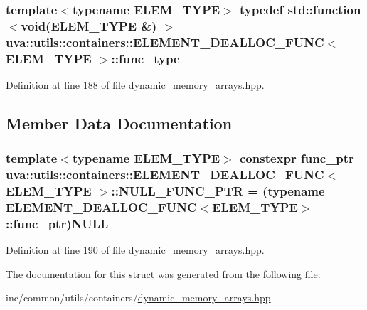 \subsubsection[{func\+\_\+type}]{\setlength{\rightskip}{0pt plus 5cm}template$<$typename E\+L\+E\+M\+\_\+\+T\+Y\+P\+E$>$ typedef std\+::function$<$void(E\+L\+E\+M\+\_\+\+T\+Y\+P\+E \&) $>$ {\bf uva\+::utils\+::containers\+::\+E\+L\+E\+M\+E\+N\+T\+\_\+\+D\+E\+A\+L\+L\+O\+C\+\_\+\+F\+U\+N\+C}$<$ E\+L\+E\+M\+\_\+\+T\+Y\+P\+E $>$\+::{\bf func\+\_\+type}}\label{structuva_1_1utils_1_1containers_1_1_e_l_e_m_e_n_t___d_e_a_l_l_o_c___f_u_n_c_afb6d875c179834ef4e8deca9fff30090}


Definition at line 188 of file dynamic\+\_\+memory\+\_\+arrays.\+hpp.



\subsection{Member Data Documentation}
\hypertarget{structuva_1_1utils_1_1containers_1_1_e_l_e_m_e_n_t___d_e_a_l_l_o_c___f_u_n_c_aa48b076559717c3aedd65ddc46bd3702}{}
\subsubsection[{N\+U\+L\+L\+\_\+\+F\+U\+N\+C\+\_\+\+P\+T\+R}]{\setlength{\rightskip}{0pt plus 5cm}template$<$typename E\+L\+E\+M\+\_\+\+T\+Y\+P\+E$>$ constexpr {\bf func\+\_\+ptr} {\bf uva\+::utils\+::containers\+::\+E\+L\+E\+M\+E\+N\+T\+\_\+\+D\+E\+A\+L\+L\+O\+C\+\_\+\+F\+U\+N\+C}$<$ E\+L\+E\+M\+\_\+\+T\+Y\+P\+E $>$\+::N\+U\+L\+L\+\_\+\+F\+U\+N\+C\+\_\+\+P\+T\+R = (typename {\bf E\+L\+E\+M\+E\+N\+T\+\_\+\+D\+E\+A\+L\+L\+O\+C\+\_\+\+F\+U\+N\+C}$<$E\+L\+E\+M\+\_\+\+T\+Y\+P\+E$>$\+::{\bf func\+\_\+ptr})N\+U\+L\+L\hspace{0.3cm}{\ttfamily [static]}}\label{structuva_1_1utils_1_1containers_1_1_e_l_e_m_e_n_t___d_e_a_l_l_o_c___f_u_n_c_aa48b076559717c3aedd65ddc46bd3702}


Definition at line 190 of file dynamic\+\_\+memory\+\_\+arrays.\+hpp.



The documentation for this struct was generated from the following file\+:\begin{DoxyCompactItemize}
\item 
inc/common/utils/containers/\hyperlink{dynamic__memory__arrays_8hpp}{dynamic\+\_\+memory\+\_\+arrays.\+hpp}\end{DoxyCompactItemize}
